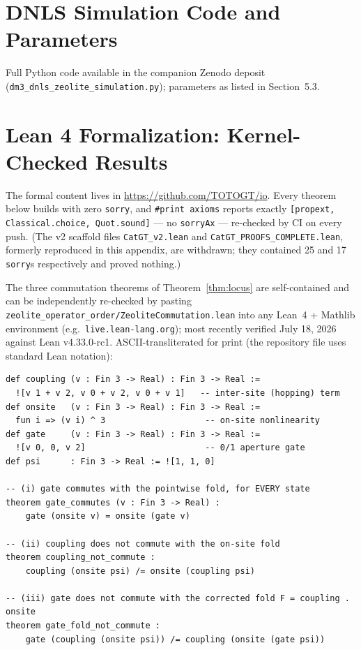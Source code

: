 \documentclass[11pt]{article}
\begin{document}
\appendix

\section{DNLS Simulation Code and Parameters}
Full Python code available in the companion Zenodo deposit (\texttt{dm3\_dnls\_zeolite\_simulation.py}); parameters as listed in Section~5.3.

\section{Lean 4 Formalization: Kernel-Checked Results}

The formal content lives in \url{https://github.com/TOTOGT/io}. Every theorem below builds with zero \texttt{sorry}, and \texttt{\#print axioms} reports exactly \texttt{[propext, Classical.choice, Quot.sound]} --- no \texttt{sorryAx} --- re-checked by CI on every push. (The v2 scaffold files \texttt{CatGT\_v2.lean} and \texttt{CatGT\_PROOFS\_COMPLETE.lean}, formerly reproduced in this appendix, are withdrawn; they contained 25 and 17 \texttt{sorry}s respectively and proved nothing.)

The three commutation theorems of Theorem~\ref{thm:locus} are self-contained and can be independently re-checked by pasting \texttt{zeolite\_operator\_order/ZeoliteCommutation.lean} into any Lean~4 + Mathlib environment (e.g.\ \texttt{live.lean-lang.org}); most recently verified July 18, 2026 against Lean v4.33.0-rc1. ASCII-transliterated for print (the repository file uses standard Lean notation):

{\small
\begin{verbatim}
def coupling (v : Fin 3 -> Real) : Fin 3 -> Real :=
  ![v 1 + v 2, v 0 + v 2, v 0 + v 1]   -- inter-site (hopping) term
def onsite   (v : Fin 3 -> Real) : Fin 3 -> Real :=
  fun i => (v i) ^ 3                    -- on-site nonlinearity
def gate     (v : Fin 3 -> Real) : Fin 3 -> Real :=
  ![v 0, 0, v 2]                        -- 0/1 aperture gate
def psi      : Fin 3 -> Real := ![1, 1, 0]

-- (i) gate commutes with the pointwise fold, for EVERY state
theorem gate_commutes (v : Fin 3 -> Real) :
    gate (onsite v) = onsite (gate v)

-- (ii) coupling does not commute with the on-site fold
theorem coupling_not_commute :
    coupling (onsite psi) /= onsite (coupling psi)

-- (iii) gate does not commute with the corrected fold F = coupling . onsite
theorem gate_fold_not_commute :
    gate (coupling (onsite psi)) /= coupling (onsite (gate psi))
\end{verbatim}
}
\end{document}
